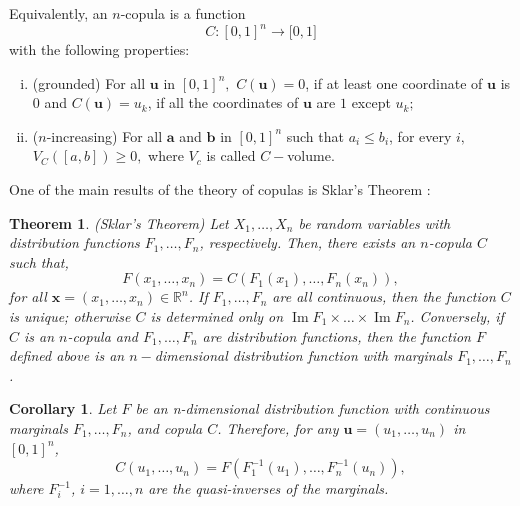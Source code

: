 \documentclass[a4paper,10pt]{article}
\DeclareMathOperator{\Ima}{Im}
\newtheorem{mytheo}{Theorem}
\newtheorem{mycoro}{Corollary}
\begin{document}
Equivalently, an $n$-copula is a function
\begin{equation*}
C:[0,1]^{n}\rightarrow \lbrack 0,1]
\end{equation*}%
with the following properties:
\begin{enumerate}[(i)]
	\item (grounded) For all $\mathbf{u}$ in $[0,1]^{n},$ $C(\mathbf{u})=0$, if at least one coordinate of $\mathbf{u}$ is $0$ and $C(\mathbf{u})=u_{k}$, if all the coordinates of $\mathbf{u}$ are $1$ except $u_{k};$ 
	\item ($n$-increasing) For all $\mathbf{a}$ and $\mathbf{b}$ in $[0,1]^{n}$ such that $a_{i}\leq b_{i}$, for every $i,$ $V_{C}\left( \left[ a,b\right] \right) \geq 0,$ where $V_{c}$ is called $C-$volume.
\end{enumerate}

One of the main results of the theory of copulas is Sklar's Theorem \citep*{sklar1959}:

\begin{mytheo}
	(Sklar's Theorem) Let $X_{1},\ldots,X_{n}$ be random variables with distribution functions $F_{1},\ldots,F_{n}$, respectively. Then, there exists an $n$-copula $C$ such that,
	\begin{equation}
	F\left( x_{1},\ldots,x_{n}\right) =C\left( F_{1}\left( x_{1}\right),\ldots,F_{n}\left(x_{n}\right) \right),  \label{21} 
	\end{equation}
	for all $\mathbf{x}=\left( x_{1},\ldots,x_{n}\right) \in\mathbb{R}^{n}$. If $F_{1},\ldots,F_{n}$ are all continuous, then the function $C$ is unique; otherwise $C$ is determined only on $\Ima F_{1}\times \ldots\times \Ima F_{n}$. Conversely, if $C$ is an $n$-copula and $F_{1},\ldots,F_{n}$ are distribution functions, then the function $F$ defined above is an $n-$dimensional distribution function with marginals $F_{1},\ldots,F_{n}$.
\end{mytheo} 

\begin{mycoro}
	Let $F$ be an n-dimensional distribution function with continuous marginals $F_{1},\ldots,F_{n}$, and copula $C$. Therefore, for any $\mathbf{u}=\left(u_{1},\ldots,u_{n}\right) $ in $\left[ 0,1\right]^{n}$,
	\begin{equation}
	C\left( u_{1},\ldots,u_{n}\right) =F\left( F_{1}^{-1}\left( u_{1}\right)
	,\ldots,F_{n}^{-1}\left( u_{n}\right) \right) ,  \label{22}
	\end{equation}
	where $F_{i}^{-1}$, $i=1,\ldots,n$ are the quasi-inverses of the marginals.
\end{mycoro}
\end{document}
